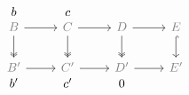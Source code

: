 \documentclass[12pt]{article}
\begin{document}
\begin{equation*}
  \begin{tikzcd}
    b & c \\[-2em]
    \color{gray}B\rar\dar[two heads] & \color{gray}C\rar\dar[black, two heads] & \color{gray}D\rar\dar[two heads] & \color{gray}E\dar[hook] \\
    \color{gray}B'\rar &\color{gray} C'\rar &\color{gray} D'\rar &\color{gray} E' \\[-2em]
    b' & c' & 0
  \end{tikzcd}
\end{equation*}
\end{document}

